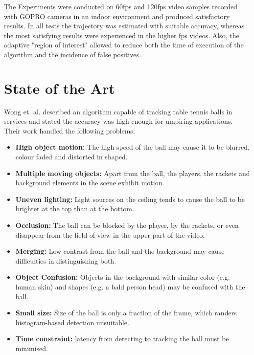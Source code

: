 \documentclass[a4paper]{article}
\begin{document}
The Experiments were conducted on 60fps and 120fps video samples recorded with GOPRO cameras in an indoor environment and produced satisfactory results. In all tests the trajectory was estimated with suitable accuracy, whereas the most satisfying results were experienced in the higher fps videos. Also, the adaptive "region of interest" allowed to reduce both the time of execution of the algorithm and the incidence of false positives.


\section{State of the Art}

Wong et. al.\cite{Wong} described an algorithm capable of tracking table tennis balls in services and stated the accuracy was high enough for umpiring applications. Their work handled the following problems:

\begin{itemize}
\item \textbf{High object motion:} The high speed of the ball may cause it to be blurred, colour faded and distorted in shaped.
\item \textbf{Multiple moving objects:} Apart from the ball, the players, the rackets and background elements in the scene exhibit motion.
\item \textbf{Uneven lighting:} Light sources on the ceiling tends to cause the ball to be brighter at the top than at the bottom.
\item \textbf{Occlusion:} The ball can be blocked by the player, by the rackets, or even disappear from the field of view in the upper part of the video.
\item \textbf{Merging:} Low contrast from the ball and the background may cause difficulties in distinguishing both.
\item \textbf{Object Confusion:} Objects in the background with similar color (e.g. human skin) and shapes (e.g. a bald person head) may be confused with the ball.
\item \textbf{Small size:} Size of the ball is only a fraction of the frame, which randers histogram-based detection unsuitable.
\item \textbf{Time constraint:} latency from detecting to tracking the ball must be minimised.
\end{itemize}
\end{document}
